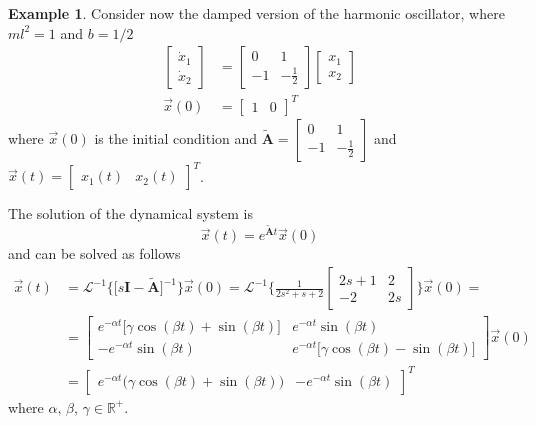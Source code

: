 \documentclass[11pt,a4paper,oneside]{book}
\numberwithin{equation}{section}
\theoremstyle{it}
\theoremstyle{definition}
\newtheorem{example}{Example}[chapter]
\begin{document}
\begin{example}
Consider now the damped version of the harmonic oscillator, where $ml^2=1$ and 
$b=1/2$
\begin{equation}
	\begin{aligned}
		\begin{bmatrix} \dot{x}_1 \\[6pt] \dot{x}_2 \end{bmatrix} &= 
		\begin{bmatrix} 0 & 1 \\[6pt] -1 & -\frac{1}{2} \end{bmatrix} 
		\begin{bmatrix} {x}_1 \\[6pt] {x}_2 \end{bmatrix} \\[6pt]
		\vec{x}(0) &= \begin{bmatrix} 1 & 0 \end{bmatrix}^T
	\end{aligned}
\end{equation}
where $\vec{x}(0)$ is the initial condition and $\tilde{\mathbf{A}} = 
\begin{bmatrix} 0 
& 1 \\ -1 & -\frac{1}{2} \end{bmatrix}$ and $\vec{x}(t)= \begin{bmatrix} x_1(t) 
& x_2(t) \end{bmatrix}^T$.

The solution of the dynamical system is
\begin{equation}
	\vec{x}(t) = e^{\tilde{\mathbf{A}}t}\vec{x}(0)
\end{equation}
and can be solved as follows
\begin{equation}
	\begin{aligned}
		\vec{x}(t) &= 
		\mathcal{L}^{-1}\Big\{\Big[s\mathbf{I}-\tilde{\mathbf{A}}\Big]^{-1} 
		\Big\}\vec{x}(0) = \mathcal{L}^{-1}\Big\{ \frac{1}{2s^2+s+2} 
		\begin{bmatrix} 2s+1 & 2 \\ -2 & 2s \end{bmatrix}\Big\}\vec{x}(0) = 
		\\[6pt]
		&= \begin{bmatrix} e^{-\alpha t}\Big[\gamma \cos(\beta t)+\sin(\beta t)\Big] & e^{-\alpha t}\sin(\beta t) \\ -e^{-\alpha t}\sin(\beta t) & e^{-\alpha t}\Big[\gamma \cos(\beta t)-\sin(\beta t)\Big] \end{bmatrix}\vec{x}(0) \\[6pt]
		&= \begin{bmatrix} e^{-\alpha t}\Big(\gamma \cos(\beta t)+\sin(\beta t)\Big) & -e^{-\alpha t}\sin(\beta t) \end{bmatrix}^T
	\end{aligned}
\end{equation}
where $\alpha,\,\beta,\,\gamma\in\mathbb{R}^+$.


\end{example}
\end{document}
